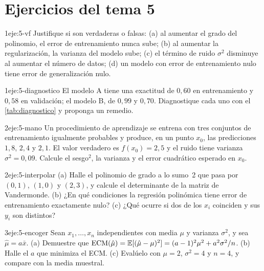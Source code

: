 \section*{Ejercicios del tema 5}

\begin{ejercicio}{1}{eje:5-vf}
Justifique si son verdaderas o falsas: (a) al aumentar el grado del polinomio, el error de entrenamiento nunca sube; (b) al aumentar la regularización, la varianza del modelo sube; (c) el término de ruido $\sigma^{2}$ disminuye al aumentar el número de datos; (d) un modelo con error de entrenamiento nulo tiene error de generalización nulo.
\end{ejercicio}

\begin{ejercicio}{1}{eje:5-diagnostico}
El modelo A tiene una exactitud de $0{,}60$ en entrenamiento y $0{,}58$ en validación; el modelo B, de $0{,}99$ y $0{,}70$. Diagnostique cada uno con el \cref{tab:diagnostico} y proponga un remedio.
\end{ejercicio}

\begin{ejercicio}{2}{eje:5-mano}
Un procedimiento de aprendizaje se entrena con tres conjuntos de entrenamiento igualmente probables y produce, en un punto $x_0$, las predicciones $1{,}8$, $2{,}4$ y $2{,}1$. El valor verdadero es $f(x_0)=2{,}5$ y el ruido tiene varianza $\sigma^{2}=0{,}09$. Calcule el sesgo$^{2}$, la varianza y el error cuadrático esperado en $x_0$.
\end{ejercicio}

\begin{ejercicio}{2}{eje:5-interpolar}
(a) Halle el polinomio de grado a lo sumo~2 que pasa por $(0,1)$, $(1,0)$ y $(2,3)$, y calcule el determinante de la matriz de Vandermonde. (b) ¿En qué condiciones la regresión polinómica tiene error de entrenamiento exactamente nulo? (c) ¿Qué ocurre si dos de los $x_i$ coinciden y sus $y_i$ son distintos?
\end{ejercicio}

\begin{ejercicio}{3}{eje:5-encoger}
Sean $x_1,\dots,x_n$ independientes con media $\mu$ y varianza $\sigma^{2}$, y sea $\hat\mu=a\bar x$. (a) Demuestre que $\operatorname{ECM}(\hat\mu)=\mathbb{E}[(\hat\mu-\mu)^{2}]=(a-1)^{2}\mu^{2}+a^{2}\sigma^{2}/n$. (b) Halle el $a$ que minimiza el ECM. (c) Evalúelo con $\mu=2$, $\sigma^{2}=4$ y $n=4$, y compare con la media muestral.
\end{ejercicio}

